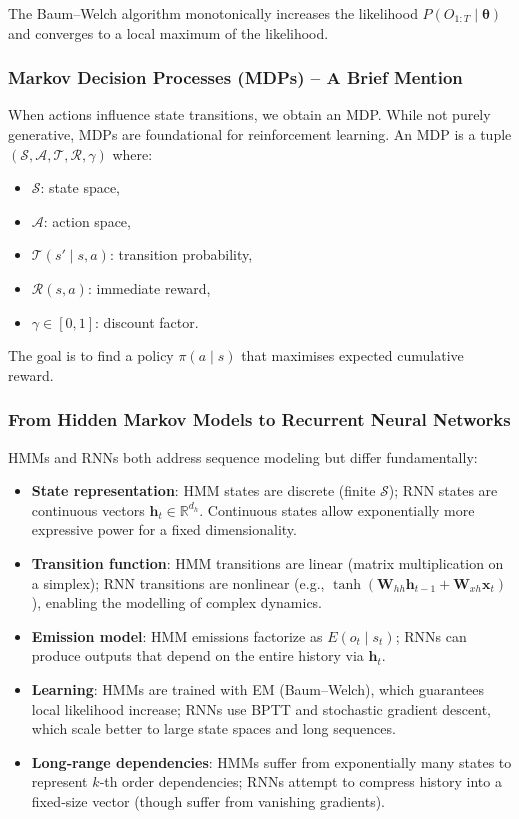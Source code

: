 \documentclass{tufte-handout}
\begin{document}
\begin{thm}
    The Baum–Welch algorithm monotonically increases the likelihood $P(O_{1:T} \mid \boldsymbol{\theta})$ and converges to a local maximum of the likelihood.
\end{thm}

\subsubsection{Markov Decision Processes (MDPs) – A Brief Mention}

When actions influence state transitions, we obtain an MDP. While not purely generative, MDPs are foundational for reinforcement learning. An MDP is a tuple $(\mathcal{S}, \mathcal{A}, \mathcal{T}, \mathcal{R}, \gamma)$ where:
\begin{itemize}
    \item $\mathcal{S}$: state space,
    \item $\mathcal{A}$: action space,
    \item $\mathcal{T}(s' \mid s, a)$: transition probability,
    \item $\mathcal{R}(s,a)$: immediate reward,
    \item $\gamma \in [0,1]$: discount factor.
\end{itemize}
The goal is to find a policy $\pi(a \mid s)$ that maximises expected cumulative reward.

\subsubsection{From Hidden Markov Models to Recurrent Neural Networks}

HMMs and RNNs both address sequence modeling but differ fundamentally:

\begin{itemize}
    \item \textbf{State representation}: HMM states are discrete (finite $\mathcal{S}$); RNN states are continuous vectors $\mathbf{h}_t \in \mathbb{R}^{d_h}$. Continuous states allow exponentially more expressive power for a fixed dimensionality.
    \item \textbf{Transition function}: HMM transitions are linear (matrix multiplication on a simplex); RNN transitions are nonlinear (e.g., $\tanh(\mathbf{W}_{hh}\mathbf{h}_{t-1} + \mathbf{W}_{xh}\mathbf{x}_t)$), enabling the modelling of complex dynamics.
    \item \textbf{Emission model}: HMM emissions factorize as $E(o_t \mid s_t)$; RNNs can produce outputs that depend on the entire history via $\mathbf{h}_t$.
    \item \textbf{Learning}: HMMs are trained with EM (Baum–Welch), which guarantees local likelihood increase; RNNs use BPTT and stochastic gradient descent, which scale better to large state spaces and long sequences.
    \item \textbf{Long‑range dependencies}: HMMs suffer from exponentially many states to represent $k$‑th order dependencies; RNNs attempt to compress history into a fixed‑size vector (though suffer from vanishing gradients).
\end{itemize}
\end{document}
